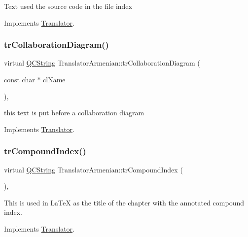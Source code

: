 Text used the source code in the file index 

Implements \mbox{\hyperlink{class_translator}{Translator}}.

\mbox{\label{class_translator_armenian_aae1a5a68fd82943b31ea5b58aec670a2}} 
\subsubsection{\texorpdfstring{trCollaborationDiagram()}{trCollaborationDiagram()}}
{\footnotesize\ttfamily virtual \mbox{\hyperlink{class_q_c_string}{Q\+C\+String}} Translator\+Armenian\+::tr\+Collaboration\+Diagram (\begin{DoxyParamCaption}\item[{const char $\ast$}]{cl\+Name }\end{DoxyParamCaption})\hspace{0.3cm}{\ttfamily [inline]}, {\ttfamily [virtual]}}

this text is put before a collaboration diagram 

Implements \mbox{\hyperlink{class_translator}{Translator}}.

\mbox{\label{class_translator_armenian_a7b4b27fb8ec19f3d6d533d51c9727b34}} 
\subsubsection{\texorpdfstring{trCompoundIndex()}{trCompoundIndex()}}
{\footnotesize\ttfamily virtual \mbox{\hyperlink{class_q_c_string}{Q\+C\+String}} Translator\+Armenian\+::tr\+Compound\+Index (\begin{DoxyParamCaption}{ }\end{DoxyParamCaption})\hspace{0.3cm}{\ttfamily [inline]}, {\ttfamily [virtual]}}

This is used in La\+TeX as the title of the chapter with the annotated compound index. 

Implements \mbox{\hyperlink{class_translator}{Translator}}.

